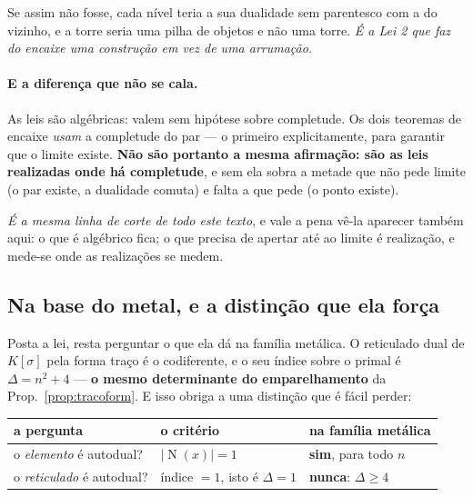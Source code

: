 \documentclass[livro.tex]{subfiles}
\begin{document}
\medskip
\noindent Se assim não fosse, cada nível teria a sua dualidade sem parentesco com a do vizinho, e a
torre seria uma pilha de objetos e não uma torre. \emph{É a Lei 2 que faz do encaixe uma
construção em vez de uma arrumação.}

\paragraph{E a diferença que não se cala.} As leis são algébricas: valem sem hipótese sobre
completude. Os dois teoremas de encaixe \emph{usam} a completude do par --- o primeiro
explicitamente, para garantir que o limite existe. \textbf{Não são portanto a mesma afirmação:
são as leis realizadas onde há completude}, e sem ela sobra a metade que não pede limite (o par
existe, a dualidade comuta) e falta a que pede (o ponto existe).

\medskip
\noindent \emph{É a mesma linha de corte de todo este texto}, e vale a pena vê-la aparecer também
aqui: o que é algébrico fica; o que precisa de apertar até ao limite é realização, e mede-se onde
as realizações se medem.


\subsection{Na base do metal, e a distinção que ela força}\label{sec:penteметal}

\noindent Posta a lei, resta perguntar o que ela dá na família metálica. O reticulado dual de
$K[\sigma]$ pela forma traço é o codiferente, e o seu índice sobre o primal é $\Delta=n^{2}+4$ ---
\textbf{o mesmo determinante do emparelhamento} da Prop.~\ref{prop:tracoform}. E isso obriga a uma
distinção que é fácil perder:

\begin{center}\small
\begin{tabular}{@{}lll@{}}
\toprule
\textbf{a pergunta} & \textbf{o critério} & \textbf{na família metálica} \\
\midrule
o \emph{elemento} é autodual? & $|\operatorname{N}(x)|=1$ & \textbf{sim}, para todo $n$ \\
o \emph{reticulado} é autodual? & índice $=1$, isto é $\Delta=1$ & \textbf{nunca}: $\Delta\geq4$ \\
\bottomrule
\end{tabular}
\end{center}

\end{document}
